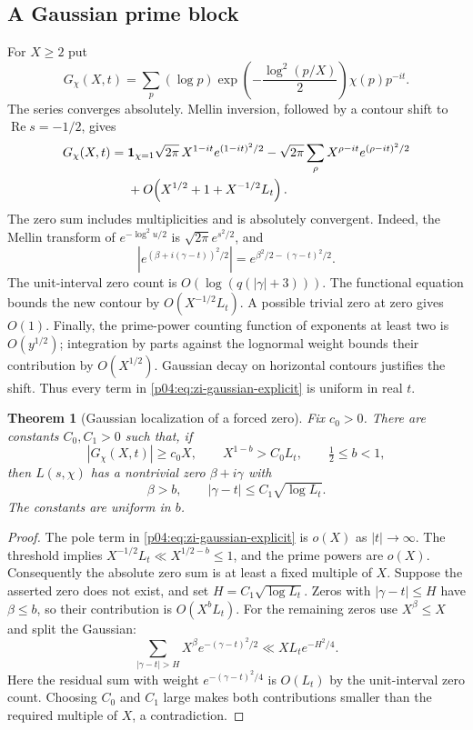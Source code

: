 \documentclass[11pt,letterpaper]{article}
\newtheorem{theorem}{Theorem}[section]
\theoremstyle{definition}
\theoremstyle{remark}
\renewcommand{\Re}{\operatorname{Re}}
\newcommand{\1}{\mathbf 1}
\begin{document}
\subsection{A Gaussian prime block}

For $X\ge2$ put
\[
 G_\chi(X,t)=\sum_p(\log p)
       \exp\!\left(-\frac{\log^2(p/X)}2\right)\chi(p)p^{-it}.
\]
The series converges absolutely.  Mellin inversion, followed by a
contour shift to $\Re s=-1/2$, gives
\begin{align}
G_\chi(X,t)
={}&\mathbf1_{\chi=1}\sqrt{2\pi}\,
 X^{1-it}e^{(1-it)^2/2}
 -\sqrt{2\pi}\sum_\rho X^{\rho-it}e^{(\rho-it)^2/2}
 \notag\\
&+O\!\left(X^{1/2}+1+X^{-1/2}L_t\right).
\label{p04:eq:zi-gaussian-explicit}
\end{align}
The zero sum includes multiplicities and is absolutely convergent.
Indeed, the Mellin transform of $e^{-\log^2 u/2}$ is
$\sqrt{2\pi}e^{s^2/2}$, and
\[
 |e^{(\beta+i(\gamma-t))^2/2}|
 =e^{\beta^2/2-(\gamma-t)^2/2}.
\]
The unit-interval zero count is $O(\log(q(|\gamma|+3)))$.
The functional equation bounds the new contour by
$O(X^{-1/2}L_t)$.  A possible trivial zero at zero gives $O(1)$.
Finally, the prime-power counting function of exponents at least two
is $O(y^{1/2})$; integration by parts against the lognormal weight
bounds their contribution by $O(X^{1/2})$.  Gaussian decay on
horizontal contours justifies the shift.  Thus every term in
\eqref{p04:eq:zi-gaussian-explicit} is uniform in real $t$.

\begin{theorem}[Gaussian localization of a forced zero]
\label{p04:thm:zi-gaussian-inverse}
Fix $c_0>0$.  There are constants $C_0,C_1>0$ such that, if
\[
 |G_\chi(X,t)|\ge c_0X,\qquad
 X^{1-b}>C_0L_t,\qquad \tfrac12\le b<1,
\]
then $L(s,\chi)$ has a nontrivial zero $\beta+i\gamma$ with
\[
 \beta>b,\qquad |\gamma-t|\le C_1\sqrt{\log L_t}.
\]
The constants are uniform in $b$.
\end{theorem}
\begin{proof}
The pole term in \eqref{p04:eq:zi-gaussian-explicit} is $o(X)$ as
$|t|\to\infty$.  The threshold implies
$X^{-1/2}L_t\ll X^{1/2-b}\le1$, and the prime powers are $o(X)$.
Consequently the absolute zero sum is at least a fixed multiple of
$X$.  Suppose the asserted zero does not exist, and set
$H=C_1\sqrt{\log L_t}$.  Zeros with $|\gamma-t|\le H$ have
$\beta\le b$, so their contribution is $O(X^bL_t)$.
For the remaining zeros use $X^\beta\le X$ and split the Gaussian:
\[
 \sum_{|\gamma-t|>H}
 X^\beta e^{-(\gamma-t)^2/2}
 \ll XL_t e^{-H^2/4}.
\]
Here the residual sum with weight $e^{-(\gamma-t)^2/4}$ is
$O(L_t)$ by the unit-interval zero count.  Choosing $C_0$ and $C_1$
large makes both contributions smaller than the required multiple
of $X$, a contradiction.
\end{proof}
\end{document}
